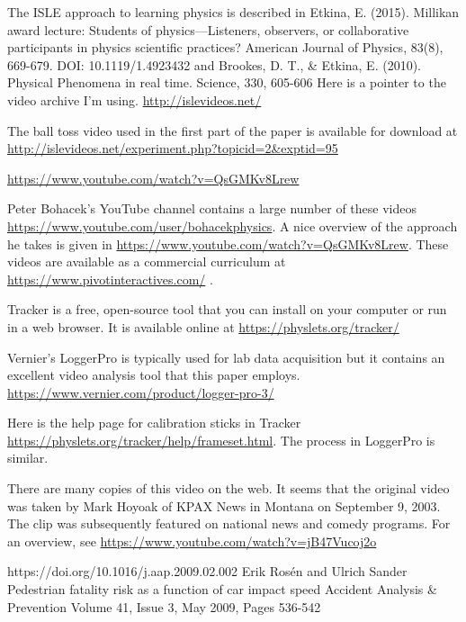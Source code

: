 \documentclass[prb,twocolumn]{revtex4-2}
\begin{document}
\begin{thebibliography}{99}

The ISLE approach to learning physics is described in 
Etkina, E. (2015). Millikan award lecture: Students of physics—Listeners, observers, or collaborative participants in physics scientific practices? American Journal of Physics, 83(8), 669-679. DOI: 10.1119/1.4923432 and 
Brookes, D. T., \& Etkina, E. (2010). Physical Phenomena in real time. Science, 330, 605-606
Here is a pointer to the video archive I'm using. \url{http://islevideos.net/}

  
The ball toss video used in the first part of the paper is available for download at \url{http://islevideos.net/experiment.php?topicid=2&exptid=95}

\url{https://www.youtube.com/watch?v=QsGMKv8Lrew}

 Peter Bohacek's YouTube channel contains a large number of these videos \url{https://www.youtube.com/user/bohacekphysics}.  
A nice overview of the approach he takes is given in \url{https://www.youtube.com/watch?v=QsGMKv8Lrew}. 
These videos are available as a commercial curriculum at \url{https://www.pivotinteractives.com/} .

 Tracker is a free, open-source tool that you can install on your computer or run in a web browser.  It is available online at \url{https://physlets.org/tracker/} 

 Vernier's LoggerPro is typically used for lab data acquisition but it contains an excellent video analysis tool that this paper employs. 
\url{https://www.vernier.com/product/logger-pro-3/}

 Here is the help page for calibration sticks in Tracker \url{https://physlets.org/tracker/help/frameset.html}.  The process in LoggerPro is similar.

There are many copies of this video on the web.  It seems that the original video was taken by Mark Hoyoak of KPAX News in Montana on September 9, 2003.  The clip was subsequently featured on national news and comedy programs.  For an overview, see \url{https://www.youtube.com/watch?v=jB47Vucoj2o}
   
https://doi.org/10.1016/j.aap.2009.02.002
Erik Rosén and Ulrich Sander
Pedestrian fatality risk as a function of car impact speed
Accident Analysis \& Prevention
Volume 41, Issue 3, May 2009, Pages 536-542



\end{thebibliography}
\end{document}

